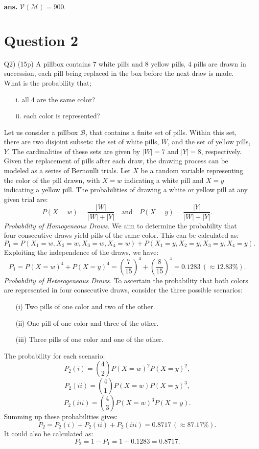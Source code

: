 \documentclass[12pt]{article}
\begin{document}
\vfill
\begin{flushright}
\textbf{ans.} \(\mathcal{V}(\mathcal{M})=900.\)
\end{flushright}

\newpage
\section*{Question 2}
\begin{q}
Q2) (15p) A pillbox contains 7 white pills and 8 yellow pills, 4 pills are drawn in succession, each pill being replaced in the box before the next draw is made. What is the probability that;

\begin{itemize}
\centering
\item[i.]  all 4 are the same color?
\item[ii.] each color is represented?
\end{itemize}
\end{q}

Let us consider a pillbox \(\mathcal{B}\), that contains a finite set of pills. Within this set, there are two disjoint subsets: the set of white pills, \(W\), and the set of yellow pills, \(Y\). The cardinalities of these sets are given by \(|W| = 7\) and \(|Y| = 8\), respectively. Given the replacement of pills after each draw, the drawing process can be modeled as a series of Bernoulli trials. Let \(X\) be a random variable representing the color of the pill drawn, with \(X = w\) indicating a white pill and \(X = y\) indicating a yellow pill. The probabilities of drawing a white or yellow pill at any given trial are: \[ P(X = w) = \frac{|W|}{|W| + |Y|} \quad \text{and} \quad P(X = y) = \frac{|Y|}{|W| + |Y|}. \] \textit{Probability of Homogeneous Draws.} We aim to determine the probability that four consecutive draws yield pills of the same color. This can be calculated as: \[ P_1 = P(X_1 = w, X_2 = w, X_3 = w, X_4 = w) + P(X_1 = y, X_2 = y, X_3 = y, X_4 = y). \] Exploiting the independence of the draws, we have: \AnswerTag \[ P_1 = P(X = w)^4 + P(X = y)^4 = \left(\frac{7}{15}\right)^4+\left(\frac{8}{15}\right)^4 = 0.1283 \, (\approx 12.83\%). \] \textit{Probability of Heterogeneous Draws.} To ascertain the probability that both colors are represented in four consecutive draws, consider the three possible scenarios: \begin{itemize} \centering \item[(i)] Two pills of one color and two of the other. \item[(ii)] One pill of one color and three of the other. \item[(iii)] Three pills of one color and one of the other. \end{itemize} The probability for each scenario: \[ P_2(i) = \binom{4}{2} P(X = w)^2 P(X = y)^2, \] \[ P_2(ii) = \binom{4}{1} P(X = w) P(X = y)^3 ,\] \[ P_2(iii) = \binom{4}{3} P(X = w)^3 P(X = y). \] Summing up these probabilities gives: \AnswerTag \[ P_2 = P_2(i) + P_2(ii) + P_2(iii) = 0.8717 \, (\approx 87.17\%). \] It could also be calculated as: \[P_2=1-P_1 = 1- 0.1283 = 0.8717. \]
\end{document}
